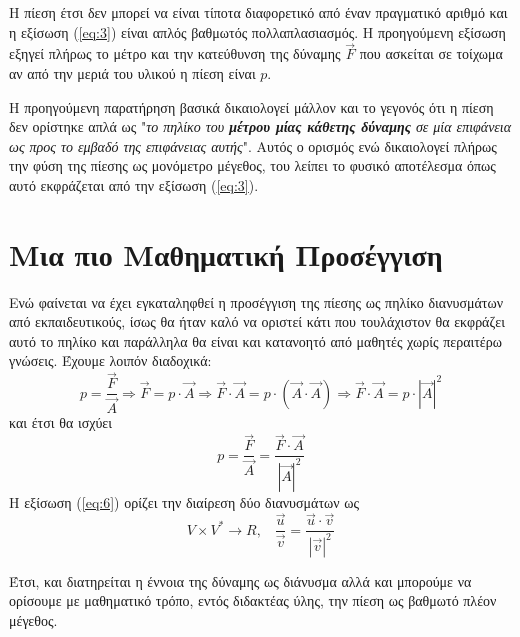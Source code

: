 \documentclass[12pt,titlepage]{article}
\begin{document}
Η πίεση έτσι δεν μπορεί να είναι τίποτα διαφορετικό από έναν πραγματικό αριθμό και η εξίσωση (\ref{eq:3}) είναι απλός βαθμωτός πολλαπλασιασμός. Η προηγούμενη εξίσωση εξηγεί πλήρως το μέτρο και την κατεύθυνση της δύναμης $\vec{F}$ που ασκείται σε τοίχωμα αν από την μεριά του υλικού η πίεση είναι $p$.

Η προηγούμενη παρατήρηση βασικά δικαιολογεί μάλλον και το γεγονός ότι η πίεση δεν ορίστηκε απλά ως "\textit{το πηλίκο του \textbf{μέτρου μίας κάθετης δύναμης} σε μία επιφάνεια ως προς το εμβαδό της επιφάνειας αυτής}". Αυτός ο ορισμός ενώ δικαιολογεί πλήρως την φύση της πίεσης ως μονόμετρο μέγεθος, του λείπει το φυσικό αποτέλεσμα όπως αυτό εκφράζεται από την εξίσωση (\ref{eq:3}).

\section{Μια πιο Μαθηματική Προσέγγιση}

Ενώ φαίνεται να έχει εγκαταληφθεί η προσέγγιση της πίεσης ως πηλίκο διανυσμάτων από εκπαιδευτικούς, ίσως θα ήταν καλό να οριστεί κάτι που τουλάχιστον θα εκφράζει αυτό το πηλίκο και παράλληλα θα είναι και κατανοητό από μαθητές χωρίς περαιτέρω γνώσεις. Έχουμε λοιπόν διαδοχικά:
\begin{equation} \label{eq:5}
 p=\frac{\vec{F}}{\vec{A}} \Rightarrow \vec{F}=p\cdot \vec{A} \Rightarrow \vec{F}\cdot \vec{A}=p\cdot (\vec{A}\cdot \vec{A}) \Rightarrow \vec{F}\cdot \vec{A}= p\cdot\left| \vec{A} \right|^2
\end{equation}
και έτσι θα ισχύει
\begin{equation} \label{eq:6}
 p=\frac{\vec{F}}{\vec{A}}=\frac{\vec{F}\cdot\vec{A}}{\left| \vec{A} \right|^2}
\end{equation}
Η εξίσωση (\ref{eq:6}) ορίζει την διαίρεση δύο διανυσμάτων ως
\begin{equation} \label{eq:7}
 V\times V^* \to R \text{,}\quad \frac{\vec{u}}{\vec{v}}=\frac{\vec{u} \cdot \vec{v}}{|\vec{v}|^2}
\end{equation}

Έτσι, και διατηρείται η έννοια της δύναμης ως διάνυσμα αλλά και μπορούμε να ορίσουμε με μαθηματικό τρόπο, εντός διδακτέας ύλης, την πίεση ως βαθμωτό πλέον μέγεθος.
\end{document}
